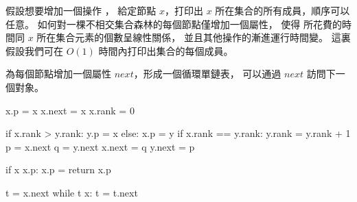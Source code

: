 \startEXERCISE
假設想要增加一個操作 ，
給定節點 $x$，打印出 $x$ 所在集合的所有成員，順序可以任意。
如何對一棵不相交集合森林的每個節點僅增加一個屬性，
使得  所花費的時間同 $x$ 所在集合元素的個數呈線性關係，
並且其他操作的漸進運行時間變。
這裏假設我們可在 $O(1)$ 時間內打印出集合的每個成員。
\stopEXERCISE

\startANSWER
為每個節點增加一個屬性 $next$，形成一個循環單鏈表，
可以通過 $next$ 訪問下一個對象。

\startCLRSCODE
x.p = x
x.next = x
x.rank = 0
\stopCLRSCODE

\startCLRSCODE
{}
\stopCLRSCODE

\startCLRSCODE
if x.rank > y.rank:
	y.p = x
else:
	x.p = y
	if x.rank == y.rank:
		y.rank = y.rank + 1
p = x.next
q = y.next
x.next = q
y.next = p
\stopCLRSCODE

\startCLRSCODE
if x \ne x.p:
	x.p = 
return x.p
\stopCLRSCODE

\startCLRSCODE
{}
t = x.next
while t \ne x:
	t = t.next
\stopCLRSCODE
\stopANSWER
